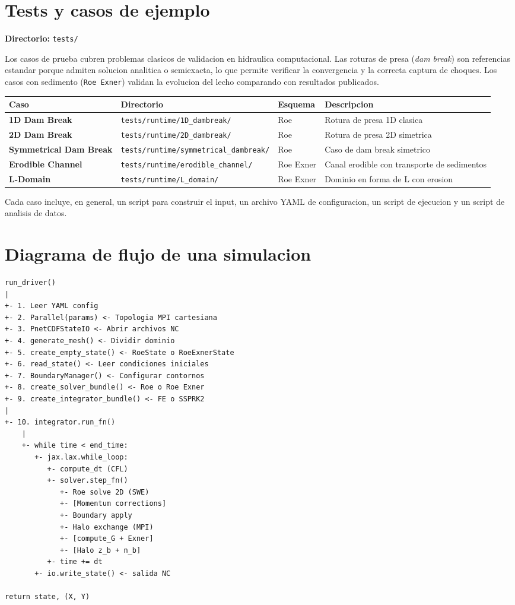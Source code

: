 \documentclass[11pt,a4paper]{article}
\newcommand{\code}[1]{\texttt{#1}}
\begin{document}
\section{Tests y casos de ejemplo}

\textbf{Directorio:} \code{tests/}

Los casos de prueba cubren problemas clasicos de validacion en hidraulica computacional.
Las roturas de presa (\emph{dam break}) son referencias estandar porque admiten solucion
analitica o semiexacta, lo que permite verificar la convergencia y la correcta captura de
choques. Los casos con sedimento (\code{Roe Exner}) validan la evolucion del lecho comparando
con resultados publicados.

{\footnotesize
\begin{longtable}{L{2.8cm}L{6.1cm}L{1.8cm}L{3.5cm}}
\toprule
Caso & Directorio & Esquema & Descripcion \\
\midrule
\endhead
\textbf{1D Dam Break} & \code{tests/runtime/1D\_dambreak/} & Roe & Rotura de presa 1D clasica \\
\textbf{2D Dam Break} & \code{tests/runtime/2D\_dambreak/} & Roe & Rotura de presa 2D simetrica \\
\textbf{Symmetrical Dam Break} & \code{tests/runtime/symmetrical\_dambreak/} & Roe & Caso de dam break simetrico \\
\textbf{Erodible Channel} & \code{tests/runtime/erodible\_channel/} & Roe Exner & Canal erodible con transporte de sedimentos \\
\textbf{L-Domain} & \code{tests/runtime/L\_domain/} & Roe Exner & Dominio en forma de L con erosion \\
\bottomrule
\end{longtable}
}

Cada caso incluye, en general, un script para construir el input, un archivo YAML de configuracion,
un script de ejecucion y un script de analisis de datos.

\section{Diagrama de flujo de una simulacion}

\begin{Verbatim}[fontsize=\small]
run_driver()
|
+- 1. Leer YAML config
+- 2. Parallel(params) <- Topologia MPI cartesiana
+- 3. PnetCDFStateIO <- Abrir archivos NC
+- 4. generate_mesh() <- Dividir dominio
+- 5. create_empty_state() <- RoeState o RoeExnerState
+- 6. read_state() <- Leer condiciones iniciales
+- 7. BoundaryManager() <- Configurar contornos
+- 8. create_solver_bundle() <- Roe o Roe Exner
+- 9. create_integrator_bundle() <- FE o SSPRK2
|
+- 10. integrator.run_fn()
    |
    +- while time < end_time:
       +- jax.lax.while_loop:
          +- compute_dt (CFL)
          +- solver.step_fn()
             +- Roe solve 2D (SWE)
             +- [Momentum corrections]
             +- Boundary apply
             +- Halo exchange (MPI)
             +- [compute_G + Exner]
             +- [Halo z_b + n_b]
          +- time += dt
       +- io.write_state() <- salida NC

return state, (X, Y)
\end{Verbatim}
\end{document}
